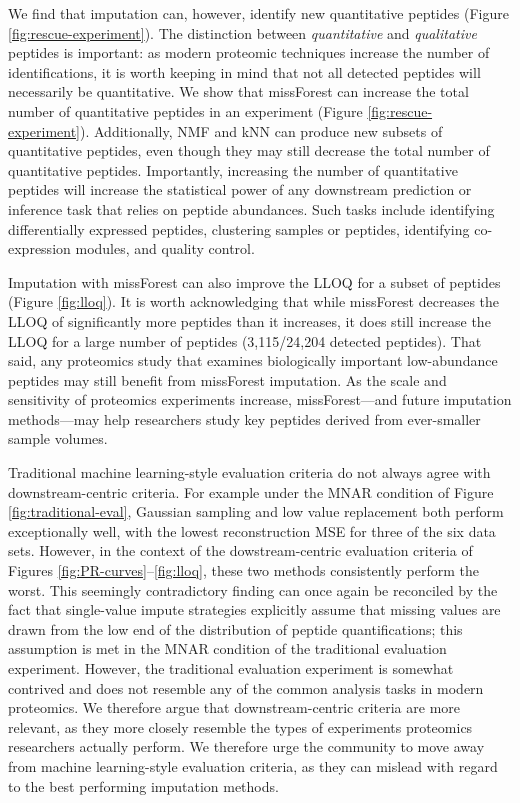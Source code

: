 \documentclass{article}
\begin{document}
We find that imputation can, however, identify new quantitative peptides (Figure \ref{fig:rescue-experiment}). The distinction between \textit{quantitative} and \textit{qualitative} peptides is important: as modern proteomic techniques increase the number of identifications, it is worth keeping in mind that not all detected peptides will necessarily be quantitative. We show that missForest can increase the total number of quantitative peptides in an experiment (Figure \ref{fig:rescue-experiment}). Additionally, NMF and kNN can produce new subsets of quantitative peptides, even though they may still decrease the total number of quantitative peptides. Importantly, increasing the number of quantitative peptides will increase the statistical power of any downstream prediction or inference task that relies on peptide abundances. Such tasks include identifying differentially expressed peptides, clustering samples or peptides, identifying co-expression modules, and quality control. 

Imputation with missForest can also improve the LLOQ for a subset of peptides (Figure \ref{fig:lloq}). It is worth acknowledging that while missForest decreases the LLOQ of significantly more peptides than it increases, it does still increase the LLOQ for a large number of peptides (3,115/24,204 detected peptides). That said, any proteomics study that examines biologically important low-abundance peptides may still benefit from missForest imputation. As the scale and sensitivity of proteomics experiments increase, missForest---and future imputation methods---may help researchers study key peptides derived from ever-smaller sample volumes. 

Traditional machine learning-style evaluation criteria do not always agree with downstream-centric criteria. For example under the MNAR condition of Figure \ref{fig:traditional-eval}, Gaussian sampling and low value replacement both perform exceptionally well, with the lowest reconstruction MSE for three of the six data sets. However, in the context of the dowstream-centric evaluation criteria of Figures \ref{fig:PR-curves}--\ref{fig:lloq}, these two methods consistently perform the worst. This seemingly contradictory finding can once again be reconciled by the fact that single-value impute strategies  explicitly assume that missing values are drawn from the low end of the distribution of peptide quantifications; this assumption is met in the MNAR condition of the traditional evaluation experiment. However, the traditional evaluation experiment is somewhat contrived and does not resemble any of the common analysis tasks in modern proteomics. We therefore argue that downstream-centric criteria are more relevant, as they more closely resemble the types of experiments proteomics researchers actually perform. We therefore urge the community to move away from machine learning-style evaluation criteria, as they can mislead with regard to the best performing imputation methods. 
\end{document}
